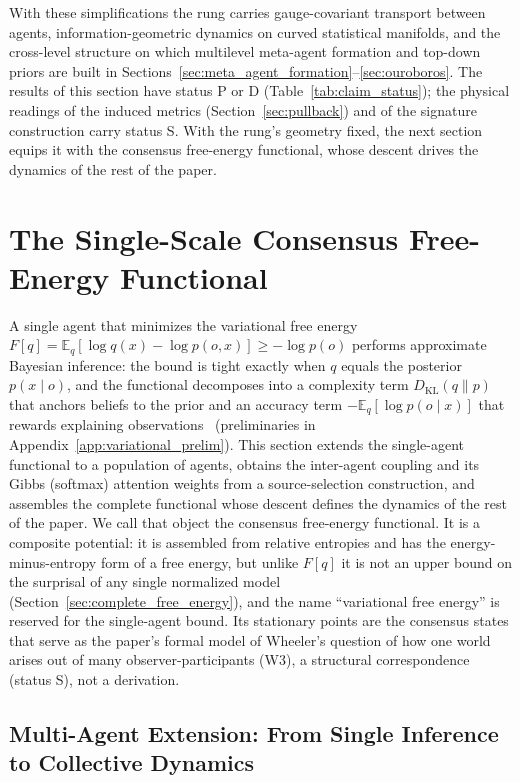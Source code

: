 \documentclass[11pt]{article}
\begin{document}
With these simplifications the rung carries gauge-covariant transport between agents, information-geometric dynamics on curved statistical manifolds, and the cross-level structure on which multilevel meta-agent formation and top-down priors are built in Sections~\ref{sec:meta_agent_formation}--\ref{sec:ouroboros}. The results of this section have status P or D (Table~\ref{tab:claim_status}); the physical readings of the induced metrics (Section~\ref{sec:pullback}) and of the signature construction carry status S. With the rung's geometry fixed, the next section equips it with the consensus free-energy functional, whose descent drives the dynamics of the rest of the paper.
\section{The Single-Scale Consensus Free-Energy Functional}\label{sec:free_energy}

A single agent that minimizes the variational free energy $F[q] = \mathbb{E}_{q}[\log q(x) - \log p(o, x)] \geq -\log p(o)$ performs approximate Bayesian inference: the bound is tight exactly when $q$ equals the posterior $p(x \mid o)$, and the functional decomposes into a complexity term $D_{\mathrm{KL}}(q \| p)$ that anchors beliefs to the prior and an accuracy term $-\mathbb{E}_{q}[\log p(o \mid x)]$ that rewards explaining observations~\cite{Friston2010, parr2022active} (preliminaries in Appendix~\ref{app:variational_prelim}). This section extends the single-agent functional to a population of agents, obtains the inter-agent coupling and its Gibbs (softmax) attention weights from a source-selection construction, and assembles the complete functional whose descent defines the dynamics of the rest of the paper. We call that object the consensus free-energy functional. It is a composite potential: it is assembled from relative entropies and has the energy-minus-entropy form of a free energy, but unlike $F[q]$ it is not an upper bound on the surprisal of any single normalized model (Section~\ref{sec:complete_free_energy}), and the name ``variational free energy'' is reserved for the single-agent bound. Its stationary points are the consensus states that serve as the paper's formal model of Wheeler's question of how one world arises out of many observer-participants (W3), a structural correspondence (status S), not a derivation.

\subsection{Multi-Agent Extension: From Single Inference to Collective Dynamics}
\end{document}
